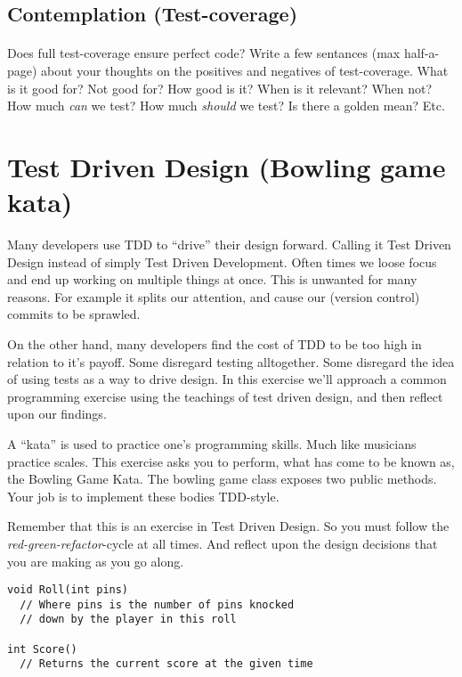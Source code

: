 \documentclass{article}
\begin{document}
\subsection{ Contemplation (Test-coverage) }
  \paragraph{}
    Does full test-coverage ensure perfect code? Write a few sentances (max half-a-page) about your thoughts on the positives and negatives of test-coverage. What is it good for? Not good for? How good is it? When is it relevant? When not? How much \emph{can} we test? How much \emph{should} we test? Is there a golden mean? Etc.







\pagebreak
\section{ Test Driven Design (Bowling game kata)}
  Many developers use TDD to ``drive'' their design forward. Calling it Test Driven Design instead of simply Test Driven Development. Often times we loose focus and end up working on multiple things at once. This is unwanted for many reasons. For example it splits our attention, and cause our (version control) commits to be sprawled.

  On the other hand, many developers find the cost of TDD to be too high in relation to it's payoff. Some disregard testing alltogether. Some disregard the idea of using tests as a way to drive design. In this exercise we'll approach a common programming exercise using the teachings of test driven design, and then reflect upon our findings.

  A ``kata'' is used to practice one's programming skills. Much like musicians practice scales. This exercise asks you to perform, what has come to be known as, the Bowling Game Kata. The bowling game class exposes two public methods. Your job is to implement these bodies TDD-style.

  Remember that this is an exercise in Test Driven Design. So you must follow the \emph{red-green-refactor}-cycle at all times. And reflect upon the design decisions that you are making as you go along.

    \begin{lstlisting}
void Roll(int pins)
  // Where pins is the number of pins knocked
  // down by the player in this roll

int Score()
  // Returns the current score at the given time
    \end{lstlisting}
\end{document}

